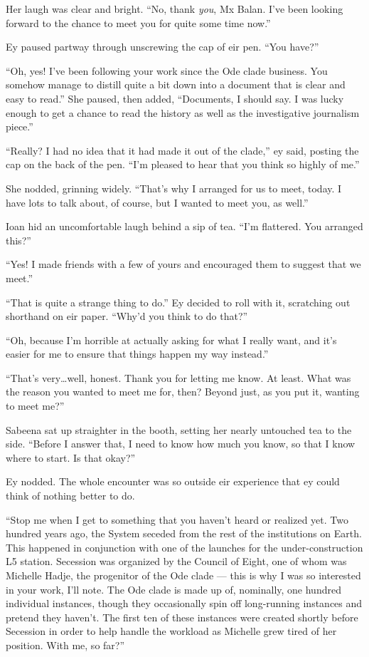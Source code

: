 Her laugh was clear and bright. ``No, thank \emph{you}, Mx Balan. I've been looking forward to the chance to meet you for quite some time now.''

Ey paused partway through unscrewing the cap of eir pen. ``You have?''

``Oh, yes! I've been following your work since the Ode clade business. You somehow manage to distill quite a bit down into a document that is clear and easy to read.'' She paused, then added, ``Documents, I should say. I was lucky enough to get a chance to read the history as well as the investigative journalism piece.''

``Really? I had no idea that it had made it out of the clade,'' ey said, posting the cap on the back of the pen. ``I'm pleased to hear that you think so highly of me.''

She nodded, grinning widely. ``That's why I arranged for us to meet, today. I have lots to talk about, of course, but I wanted to meet you, as well.''

Ioan hid an uncomfortable laugh behind a sip of tea. ``I'm flattered. You arranged this?''

``Yes! I made friends with a few of yours and encouraged them to suggest that we meet.''

``That is quite a strange thing to do.'' Ey decided to roll with it, scratching out shorthand on eir paper. ``Why'd you think to do that?''

``Oh, because I'm horrible at actually asking for what I really want, and it's easier for me to ensure that things happen my way instead.''

``That's very\ldots well, honest. Thank you for letting me know. At least. What was the reason you wanted to meet me for, then? Beyond just, as you put it, wanting to meet me?''

Sabeena sat up straighter in the booth, setting her nearly untouched tea to the side. ``Before I answer that, I need to know how much you know, so that I know where to start. Is that okay?''

Ey nodded. The whole encounter was so outside eir experience that ey could think of nothing better to do.

``Stop me when I get to something that you haven't heard or realized yet. Two hundred years ago, the System seceded from the rest of the institutions on Earth. This happened in conjunction with one of the launches for the under-construction L5 station. Secession was organized by the Council of Eight, one of whom was Michelle Hadje, the progenitor of the Ode clade — this is why I was so interested in your work, I'll note. The Ode clade is made up of, nominally, one hundred individual instances, though they occasionally spin off long-running instances and pretend they haven't. The first ten of these instances were created shortly before Secession in order to help handle the workload as Michelle grew tired of her position. With me, so far?''

